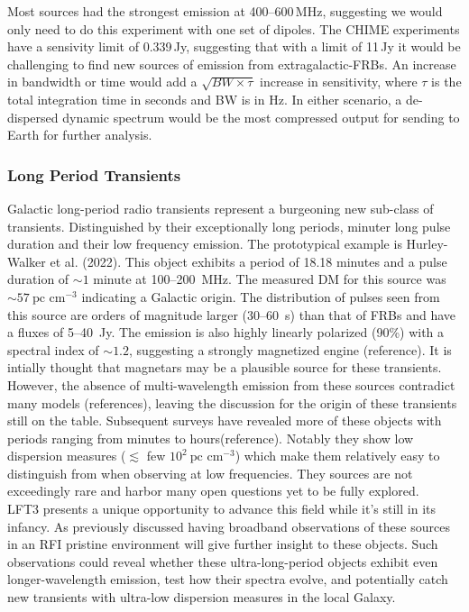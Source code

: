 Most sources had the strongest emission at 400--600\,MHz, suggesting we would only need to do this experiment with one set of dipoles. The CHIME experiments have a sensivity limit of 0.339\,Jy, suggesting that with a limit of 11\,Jy it would be challenging to find new sources of emission from extragalactic-FRBs. An increase in bandwidth or time would add a $\sqrt{BW\times\tau}$ increase in sensitivity, where $\tau$ is the total integration time in seconds and BW is in Hz. In either scenario, a de-dispersed dynamic spectrum would be the most compressed output for sending to Earth for further analysis.




\subsubsection{Long Period Transients}

Galactic long-period radio transients represent a burgeoning new sub-class of transients. Distinguished by their exceptionally long periods, minuter long pulse duration and their low frequency emission. The prototypical example is Hurley-Walker et al. (2022). This object exhibits a period of 18.18 minutes and a pulse duration of $\sim 1$ minute at 100--200~MHz. The measured DM for this source was $\sim57~\text{pc cm}^{-3}$ indicating a Galactic origin. The distribution of pulses seen from this source are orders of magnitude larger (30--60~s) than that of FRBs and have a fluxes of 5--40~Jy. The emission is also highly linearly polarized (90\%) with a spectral index of $\sim 1.2$, suggesting a strongly magnetized engine (reference). It is intially thought that magnetars may be a plausible source for these transients. However, the absence of multi-wavelength emission from these sources contradict many models (references), leaving the discussion for the origin of these transients still on the table. Subsequent surveys have revealed more of these objects with periods ranging from minutes to hours(reference). Notably they show low dispersion measures ($\lesssim$ few $10^2~\text{pc cm}^{-3}$) which make them relatively easy to distinguish from when observing at low frequencies. They sources are not exceedingly rare and harbor many open questions yet to be fully explored. \\ 
LFT3 presents a unique opportunity to advance this field while it's still in its infancy. As previously discussed having broadband observations of these sources in an RFI pristine environment will give further insight to these objects. Such observations could reveal whether these ultra-long-period objects exhibit even longer-wavelength emission, test how their spectra evolve, and potentially catch new transients with ultra-low dispersion measures in the local Galaxy. 

